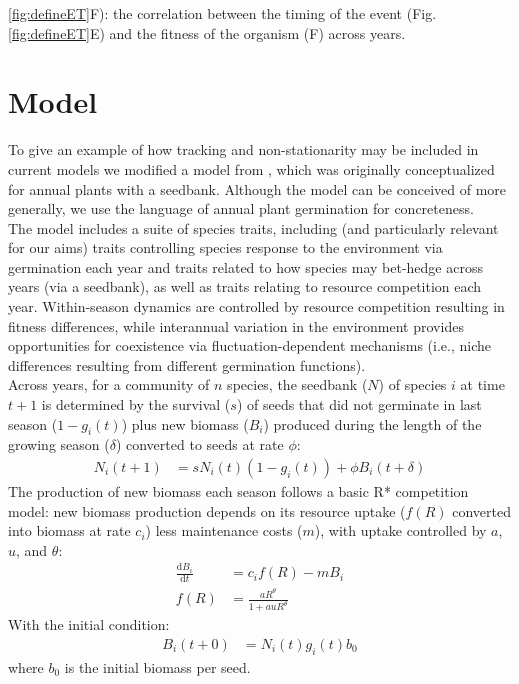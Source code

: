 \documentclass[11pt,letter]{article}
\begin{document}
\ref{fig:defineET}F): the correlation between the timing of the event (Fig. \ref{fig:defineET}E) and the fitness of the organism (F) across years.  




\newpage 
\clearpage
\section{Model} 
To give an example of how tracking and non-stationarity may be included in current models we modified a model from \citet{Chesson:2004eo}, which was originally conceptualized for annual plants with a seedbank.  Although the model can be conceived of more generally, we use the language of annual plant germination for concreteness. \\

The model includes a suite of species traits, including (and particularly relevant for our aims) traits controlling species response to the environment via germination each year and traits related to how species may bet-hedge across years (via a seedbank), as well as traits relating to resource competition each year. Within-season dynamics are controlled by resource competition resulting in fitness differences, while interannual variation in the environment provides opportunities for coexistence via fluctuation-dependent mechanisms (i.e., niche differences resulting from different germination functions). \\

Across years, for a community of \(n\) species, the seedbank ($N$) of species $i$ at time $t+1$ is determined by the survival ($s$) of seeds that did not germinate in last season ($1-g_{i}(t)$) plus new biomass ($B_i$) produced during the length of the growing season ($\delta$) converted to seeds at rate $\phi$:
\begin{align}
N_{i}(t+1) & =
s N_{i}(t)(1-g_{i}(t))+\phi B_{i}(t+\delta)
\end{align}
The production of new biomass each season follows a basic R* competition model: new biomass production depends on its resource uptake ($f(R)$ converted into biomass at rate $c_i$) less maintenance costs ($m$), with uptake controlled by $a$, $u$, and $\theta$:
\begin{align}
\frac{\mathrm{d}B_i}{\mathrm{d}t} & = c_{i}f(R) - m B_{i} \\
f(R) & = \frac{a R^{\theta}}{1+a uR^{\theta}}
\end{align}
With the initial condition:
\begin{align}
B_{i}(t+0) & = N_{i}(t)g_{i}(t)b_{0}
\end{align}
where $b_{0}$ is the initial biomass per seed.\\
\end{document}
